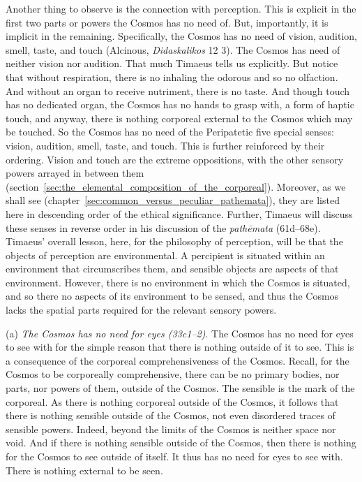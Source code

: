 Another thing to observe is the connection with perception. This is explicit in the first two parts or powers the Cosmos has no need of. But, importantly, it is implicit in the remaining. Specifically, the Cosmos has no need of vision, audition, smell, taste, and touch (Alcinous, \emph{Didaskalikos} 12 3). The Cosmos has need of neither vision nor audition. That much Timaeus tells us explicitly. But notice that without respiration, there is no inhaling the odorous and so no olfaction. And without an organ to receive nutriment, there is no taste. And though touch has no dedicated organ, the Cosmos has no hands to grasp with, a form of haptic touch, and anyway, there is nothing corporeal external to the Cosmos which may be touched. So the Cosmos has no need of the Peripatetic five special senses: vision, audition, smell, taste, and touch. This is further reinforced by their ordering. Vision and touch are the extreme oppositions, with the other sensory powers arrayed in between them (section~\ref{sec:the_elemental_composition_of_the_corporeal}). Moreover, as we shall see (chapter~\ref{sec:common_versus_peculiar_pathemata}), they are listed here in descending order of the ethical significance. Further, Timaeus will discuss these senses in reverse order in his discussion of the \emph{pathēmata} (61d--68e). Timaeus' overall lesson, here, for the philosophy of perception, will be that the objects of perception are environmental. A percipient is situated within an environment that circumscribes them, and sensible objects are aspects of that environment. However, there is no environment in which the Cosmos is situated, and so there no aspects of its environment to be sensed, and thus the Cosmos lacks the spatial parts required for the relevant sensory powers.

(a) \emph{The Cosmos has no need for eyes (33c1--2)}. The Cosmos has no need for eyes to see with for the simple reason that there is nothing outside of it to see. This is a consequence of the corporeal comprehensiveness of the Cosmos. Recall, for the Cosmos to be corporeally comprehensive, there can be no primary bodies, nor parts, nor powers of them, outside of the Cosmos. The sensible is the mark of the corporeal. As there is nothing corporeal outside of the Cosmos, it follows that there is nothing sensible outside of the Cosmos, not even disordered traces of sensible powers. Indeed, beyond the limits of the Cosmos is neither space nor void. And if there is nothing sensible outside of the Cosmos, then there is nothing for the Cosmos to see outside of itself. It thus has no need for eyes to see with. There is nothing external to be seen.


